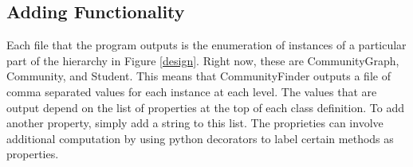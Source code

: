 \subsection{Adding Functionality}
Each file that the program outputs is the enumeration of instances of a particular part of the hierarchy in Figure \ref{design}. Right now, these are CommunityGraph, Community, and Student. This means that CommunityFinder outputs a file of comma separated values for each instance at each level. The values that are output depend on the list of properties at the top of each class definition. To add another property, simply add a string to this list. The proprieties can involve additional computation by using python decorators to label certain methods as properties. 
